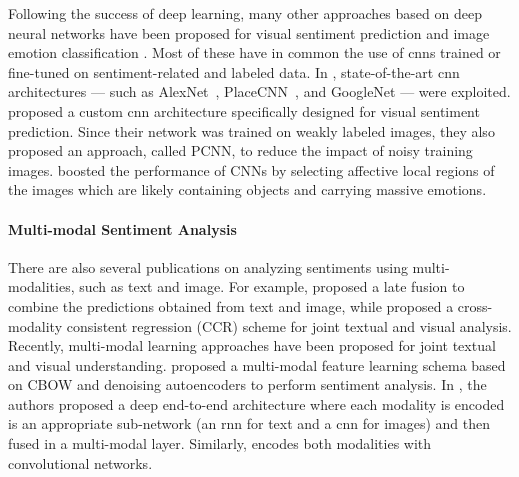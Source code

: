 Following the success of deep learning, many other approaches based on deep neural networks have been proposed for visual sentiment prediction and image emotion classification \cite{campos2017pixels,chen2014deepsentibank,islam2016visual,rao2016learning,you2015robust,xu2014visual}.
Most of these have in common the use of \glspl{cnn} trained or fine-tuned on sentiment-related and labeled data.
In \cite{campos2017pixels,chen2014deepsentibank,islam2016visual,jou2015visual}, %
state-of-the-art \gls{cnn} architectures --- such as AlexNet~\cite{krizhevsky2012imagenet}, PlaceCNN~\cite{zhou2014learning}, and GoogleNet \cite{szegedy2015going} --- were exploited.
\citet{you2015robust} proposed a custom \gls{cnn} architecture specifically designed for visual sentiment prediction.
Since their network was trained on weakly labeled images, they also proposed an approach, called PCNN, to reduce the impact of noisy training images. %
\citet{sun2016discovering} boosted the performance of CNNs by selecting affective local regions of the images which are likely containing objects and carrying massive emotions. %

\paragraph{Multi-modal Sentiment Analysis}
There are also several publications on analyzing sentiments using multi-modalities, such as text and image.
For example, \citet{cao2016cross} proposed a late fusion to combine the predictions obtained from text and image, while \citet{you2016cross} proposed a cross-modality consistent regression (CCR) scheme for joint textual and visual analysis.
Recently, multi-modal learning approaches have been proposed for joint textual and visual understanding.
\citet{baecchi2016multimodal} proposed a multi-modal feature learning schema based on CBOW and denoising autoencoders to perform sentiment analysis.
In \cite{mao2014deep}, the authors proposed a deep end-to-end architecture where each modality is encoded is an appropriate sub-network (an \gls{rnn} for text and a \gls{cnn} for images) and then fused in a multi-modal layer.
Similarly, \citet{ma2015multimodal} encodes both modalities with convolutional networks.

